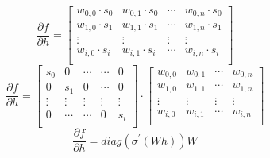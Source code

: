 \[ \frac{\partial f}{\partial h} = 
\begin{bmatrix}
    w_{0,0} \cdot s_0 & w_{0,1} \cdot s_0 & \cdots & w_{0,n} \cdot s_0\\
    w_{1,0} \cdot s_1 & w_{1,1} \cdot s_1 & \cdots & w_{1,n} \cdot s_1\\
    \vdots            & \vdots          & \vdots   & \vdots\\
    w_{i,0} \cdot s_i & w_{i,1} \cdot s_i & \cdots & w_{i,n} \cdot s_i\\
\end{bmatrix}\]
\[ \frac{\partial f}{\partial h} = 
\begin{bmatrix}
    s_0 & 0   & \cdots & \cdots & 0\\
    0   & s_1 & 0      & \cdots & 0\\
    \vdots            & \vdots          & \vdots   & \vdots & \vdots\\
    0 & \cdots & \cdots & 0 & s_i\\
\end{bmatrix}
\cdot \begin{bmatrix}
    w_{0,0}  & w_{0,1} & \cdots & w_{0,n}\\
    w_{1,0}  & w_{1,1} & \cdots & w_{1,n} \\
    \vdots  & \vdots  & \vdots  & \vdots\\
    w_{i,0} & w_{i,1} & \cdots  & w_{i,n} \\
\end{bmatrix}\]
\[\frac{\partial f}{\partial h} = diag(\sigma^{\prime}(Wh))W\]

